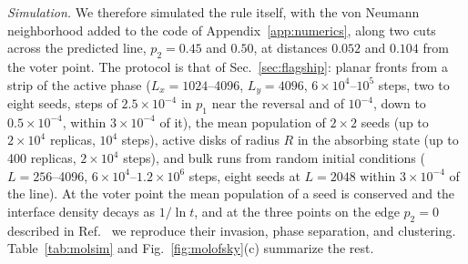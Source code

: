 \documentclass[pre,twocolumn,superscriptaddress,showpacs,floatfix]{revtex4-2}
\begin{document}
\textit{Simulation.} We therefore simulated the rule itself, with the von Neumann neighborhood
added to the code of Appendix~\ref{app:numerics}, along two cuts across the predicted line,
$p_2 = 0.45$ and $0.50$, at distances $0.052$ and $0.104$ from the voter point. The protocol is
that of Sec.~\ref{sec:flagship}: planar fronts from a strip of the active phase ($L_x = 1024$--4096,
$L_y = 4096$, $6\times10^4$--$10^5$ steps, two to eight seeds, steps of $2.5\times10^{-4}$ in
$p_1$ near the reversal and of $10^{-4}$, down to $0.5\times10^{-4}$, within $3\times10^{-4}$ of
it), the mean population of $2\times2$ seeds (up to $2\times10^4$ replicas, $10^4$
steps), active disks of radius $R$ in the absorbing state (up to 400 replicas, $2\times10^4$
steps), and bulk runs from random initial conditions ($L = 256$--4096, $6\times10^4$--$1.2\times10^6$
steps, eight seeds at $L = 2048$ within $3\times10^{-4}$ of the line). At the voter point the mean population of a seed is conserved and the interface density
decays as $1/\ln t$, and at the three points on the edge $p_2 = 0$ described in
Ref.~\cite{molofsky1999} we reproduce their invasion, phase separation, and clustering.
Table~\ref{tab:molsim} and Fig.~\ref{fig:molofsky}(c) summarize the rest.
\end{document}
